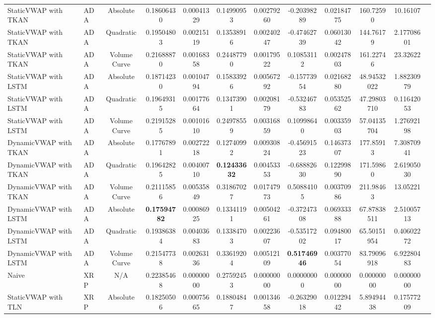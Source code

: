 \begin{table}[H]
{\begin{tabular}{llcccccccccc}
        StaticVWAP with TKAN & ADA & Absolute & 0.18606430 & 0.00041329 & 0.14990953 & 0.00279260 & -0.20398289 & 0.02184775 & 160.72590 & 10.16107 \\
        StaticVWAP with TKAN & ADA & Quadratic & 0.19504803 & 0.00215119 & 0.13538916 & 0.00240247 & -0.47462739 & 0.06013042 & 144.76179 & 2.17708601 \\
        StaticVWAP with TKAN & ADA & Volume Curve & 0.21688870 & 0.00168358 & 0.24487790 & 0.00179522 & 0.10853112 & 0.00247803 & 161.22746 & 23.32622 \\
        StaticVWAP with LSTM & ADA & Absolute & 0.18714230 & 0.00104794 & 0.15833926 & 0.00567292 & -0.15773954 & 0.02168280 & 48.94532022 & 1.88230979 \\
        StaticVWAP with LSTM & ADA & Quadratic & 0.19649315 & 0.00177664 & 0.13473901 & 0.00208179 & -0.53246783 & 0.05352562 & 47.29803710 & 0.11642053 \\
        StaticVWAP with LSTM & ADA & Volume Curve & 0.21915285 & 0.00101610 & 0.24978559 & 0.00316859 & 0.10998640 & 0.00335903 & 57.04135704 & 1.27692198 \\
        DynamicVWAP with TKAN & ADA & Absolute & 0.17767891 & 0.00272218 & 0.12740992 & 0.00930824 & -0.45691523 & 0.14637307 & 177.85913 & 7.30870941 \\
        DynamicVWAP with TKAN & ADA & Quadratic & 0.19642825 & 0.00400710 & \textbf{0.12433632} & 0.00453353 & -0.68882630 & 0.12299890 & 171.59860 & 2.61905030 \\
        DynamicVWAP with TKAN & ADA & Volume Curve & 0.21115856 & 0.00535849 & 0.31867027 & 0.01747973 & 0.50884105 & 0.00370986 & 211.98463 & 13.05221 \\
        DynamicVWAP with LSTM & ADA & Absolute & \textbf{0.17594782} & 0.00086925 & 0.13341191 & 0.00504261 & -0.37247308 & 0.06933388 & 67.87838511 & 2.51005713 \\
        DynamicVWAP with LSTM & ADA & Quadratic & 0.19386384 & 0.00403683 & 0.13384703 & 0.00223607 & -0.53517202 & 0.09480017 & 65.50151954 & 0.40602272 \\
        DynamicVWAP with LSTM & ADA & Volume Curve & 0.21547738 & 0.00263136 & 0.33619204 & 0.00512109 & \textbf{0.51746946} & 0.00377054 & 83.79096918 & 6.92280483 \\
        \hline
        Naive & XRP & N/A & 0.22385468 & 0.00000000 & 0.27592453 & 0.00000000 & 0.00000000 & 0.00000000 & 0.00000000 & 0.00000000 \\
        StaticVWAP with TLN & XRP & Absolute & 0.18250506 & 0.00075665 & 0.18804847 & 0.00134658 & -0.26329018 & 0.01229442 & 5.89494438 & 0.17577209 \\

\end{tabular}}
\end{table}
